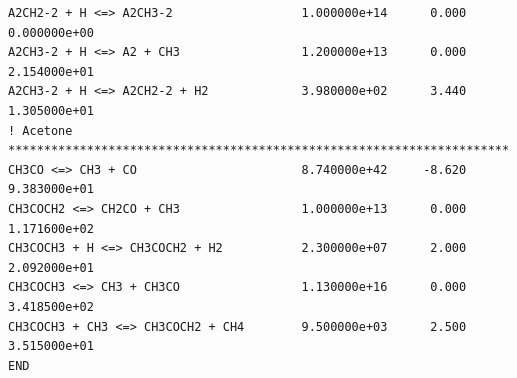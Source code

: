 \begin{verbatim}
A2CH2-2 + H <=> A2CH3-2                  1.000000e+14      0.000    0.000000e+00
A2CH3-2 + H <=> A2 + CH3                 1.200000e+13      0.000    2.154000e+01
A2CH3-2 + H <=> A2CH2-2 + H2             3.980000e+02      3.440    1.305000e+01
! Acetone **********************************************************************
CH3CO <=> CH3 + CO                       8.740000e+42     -8.620    9.383000e+01
CH3COCH2 <=> CH2CO + CH3                 1.000000e+13      0.000    1.171600e+02
CH3COCH3 + H <=> CH3COCH2 + H2           2.300000e+07      2.000    2.092000e+01
CH3COCH3 <=> CH3 + CH3CO                 1.130000e+16      0.000    3.418500e+02
CH3COCH3 + CH3 <=> CH3COCH2 + CH4        9.500000e+03      2.500    3.515000e+01
END
\end{verbatim}
\endinput
